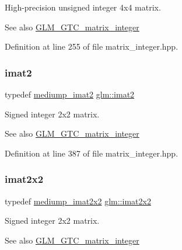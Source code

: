 High-\/precision unsigned integer 4x4 matrix. \begin{DoxySeeAlso}{See also}
\hyperlink{group__gtc__matrix__integer}{G\+L\+M\+\_\+\+G\+T\+C\+\_\+matrix\+\_\+integer} 
\end{DoxySeeAlso}


Definition at line 255 of file matrix\+\_\+integer.\+hpp.

\mbox{\label{group__gtc__matrix__integer_ga77a581b3366fb63fc72f8f20830003e0}} 
\subsubsection{\texorpdfstring{imat2}{imat2}}
{\footnotesize\ttfamily typedef \hyperlink{group__gtc__matrix__integer_gaec03a8eef2ec2536f8bebffd0bac8192}{mediump\+\_\+imat2} \hyperlink{group__gtc__matrix__integer_ga77a581b3366fb63fc72f8f20830003e0}{glm\+::imat2}}

Signed integer 2x2 matrix. \begin{DoxySeeAlso}{See also}
\hyperlink{group__gtc__matrix__integer}{G\+L\+M\+\_\+\+G\+T\+C\+\_\+matrix\+\_\+integer} 
\end{DoxySeeAlso}


Definition at line 387 of file matrix\+\_\+integer.\+hpp.

\mbox{\label{group__gtc__matrix__integer_gaf7f44f44d966377666d41ed059524732}} 
\subsubsection{\texorpdfstring{imat2x2}{imat2x2}}
{\footnotesize\ttfamily typedef \hyperlink{group__gtc__matrix__integer_ga472222f6e3754124ee9cb64acaaedac1}{mediump\+\_\+imat2x2} \hyperlink{group__gtc__matrix__integer_gaf7f44f44d966377666d41ed059524732}{glm\+::imat2x2}}

Signed integer 2x2 matrix. \begin{DoxySeeAlso}{See also}
\hyperlink{group__gtc__matrix__integer}{G\+L\+M\+\_\+\+G\+T\+C\+\_\+matrix\+\_\+integer} 
\end{DoxySeeAlso}


